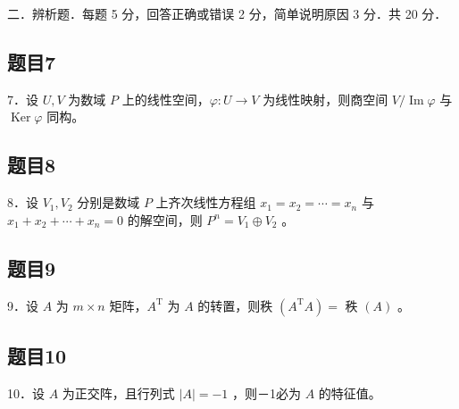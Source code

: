 \documentclass{article}
\begin{document}
二．辨析题．每题 5 分，回答正确或错误 2 分，简单说明原因 3 分．共 20 分．\\

\subsection{题目7}
7．设 \(U, V\) 为数域 \(P\) 上的线性空间，\(\varphi: U \rightarrow V\) 为线性映射，则商空间 \(V / \operatorname{Im} \varphi\) 与 \(\operatorname{Ker} \varphi\) 同构。

\subsection{题目8}
8．设 \(V_{1}, V_{2}\) 分别是数域 \(P\) 上齐次线性方程组 \(x_{1}=x_{2}=\cdots=x_{n}\) 与 \(x_{1}+x_{2}+\cdots+x_{n}=0\) 的解空间，则 \(P^{n}=V_{1} \oplus V_{2}\) 。

\subsection{题目9}
9．设 \(A\) 为 \(m \times n\) 矩阵，\(A^{\mathrm{T}}\) 为 \(A\) 的转置，则秩 \(\left(A^{\mathrm{T}} A\right)=\) 秩 \((A)\) 。

\subsection{题目10}
10．设 \(A\) 为正交阵，且行列式 \(|A|=-1\) ，则－1必为 \(A\) 的特征值。
\end{document}
